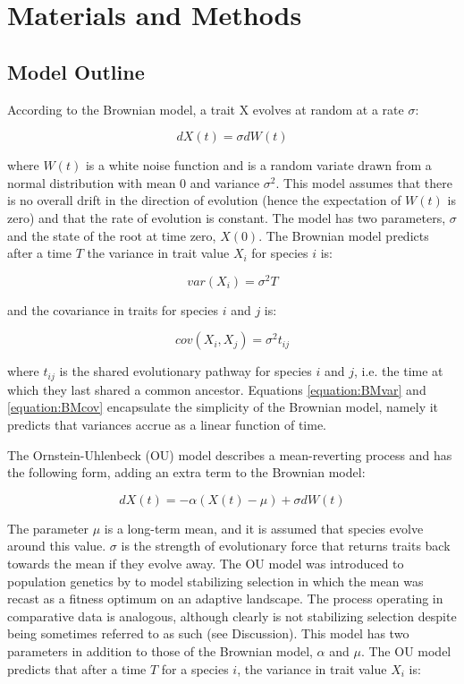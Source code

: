 \documentclass[a4paper,12pt]{article}
\begin{document}
\section{Materials and Methods}
\subsection{Model Outline} 
\label{section:models} 
According to the Brownian model, a trait X evolves at random at a rate $\sigma$:

  \begin{equation}
    dX(t) = \sigma dW(t)
    \label{equation:BMrate} 
  \end{equation}

where $W(t)$ is a white noise function and is a random variate drawn from a normal distribution with mean $0$ and variance $\sigma^2$. This model assumes that there is no overall drift in the direction of evolution (hence the expectation of $W(t)$ is zero) and that the rate of evolution is constant. The model has two parameters, $\sigma$ and the state of the root at time zero, $X(0)$. The Brownian model predicts after a time $T$ the variance in trait value $X_i$ for species $i$ is:

  \begin{equation}
    var(X_i) = \sigma^2 T
    \label{equation:BMvar} 
  \end{equation}

and the covariance in traits for species $i$ and $j$ is:
  
  \begin{equation}
    cov(X_i,X_j) = \sigma^2 t_{ij}
    \label{equation:BMcov} 
  \end{equation}

where $t_{ij}$ is the shared evolutionary pathway for species $i$ and $j$, i.e. the time at which they last shared a common ancestor.  Equations \ref{equation:BMvar} and \ref{equation:BMcov} encapsulate the simplicity of the Brownian model, namely it predicts that variances accrue as a linear function of time. 

The Ornstein-Uhlenbeck (OU) model describes a mean-reverting process and has the following form, adding an extra term to the Brownian model:

  \begin{equation}
    dX(t) = - \alpha (X(t) - \mu) + \sigma dW(t)
    \label{equation:OUrate} 
  \end{equation}

The parameter $\mu$ is a long-term mean, and it is assumed that species evolve around this value. $\sigma$ is the strength of evolutionary force that returns traits back towards the mean if they evolve away. The OU model was introduced to population genetics by \citet{Lande:1976aa} to model stabilizing selection in which the mean was recast as a fitness optimum on an adaptive landscape. The process operating in comparative data is analogous, although clearly is not stabilizing selection despite being sometimes referred to as such (see Discussion). This model has two parameters in addition to those of the Brownian model, $\alpha$ and $\mu$.
The OU model predicts that after a time $T$ for a species $i$, the variance in trait value $X_i$ is:
\end{document}
